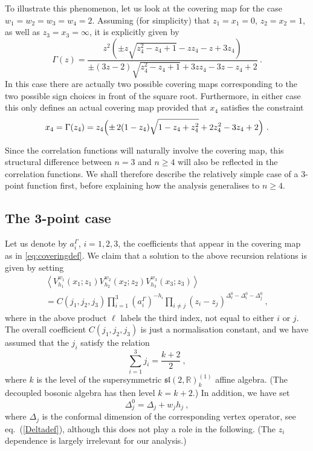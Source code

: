 \documentclass[12pt,a4paper]{article}
\newcommand{\be}{\begin{equation}}
\newcommand{\ee}{\end{equation}}
\begin{document}
To illustrate this phenomenon, let us look at the covering map for the case $w_1=w_2=w_3=w_4=2$. Assuming (for simplicity) that $z_1=x_1=0$, $z_2=x_2=1$, as well as $z_3=x_3=\infty$, it is explicitly given by
\be\label{cov2222}
\Gamma(z) = \frac{z^2 \left(\pm z \sqrt{z_4^2- z_4+1}-z z_4-z+3 z_4\right)}{\pm (3 z-2) \sqrt{z_4^2-z_4+1}+3 z z_4-3 z-z_4+2} \ .
\ee
In this case there are actually two possible covering maps corresponding to the two possible sign choices in front of the square root. Furthermore, in either case this only defines an actual covering map provided that $x_4$ satisfies the constraint
\be 
x_4=\Gamma(z_4) = z_4 \Bigl(\pm \, 2(1-z_4) \sqrt{1 - z_4 + z_4^2} + 2 z_4^2 - 3 z_4 + 2  \Bigr) \ . 
\ee
\smallskip

Since the correlation functions will naturally involve the covering map, this structural difference between $n=3$ and $n\geq 4$ will also be reflected in the correlation functions. We shall therefore describe the relatively simple case of a $3$-point function first, before explaining how the analysis generalises to $n\geq 4$. 


\subsection{The 3-point case}

Let us denote by $a_i^\Gamma$, $i=1,2,3$, the coefficients that appear in the covering map as in \eqref{eq:coveringdef}. We claim that a solution to the above recursion relations is given by setting 
\begin{multline}
 \left \langle V_{h_1}^{w_1}(x_1;z_1)V_{h_2}^{w_2}(x_2;z_2)V_{h_3}^{w_3} (x_3;z_3)\right \rangle \\
 =C(j_1,j_2,j_3)\prod_{i=1}^3 (a_i^\Gamma)^{-h_i}
\prod_{i\neq j} (z_i - z_j)^{\Delta_{\ell}^0- \Delta^0_i- \Delta^0_j} \ ,\label{eq:sol 3-point function}
\end{multline}
where in the above product $\ell$ labels the third index, not equal to either $i$ or $j$. 
The overall coefficient $C(j_1,j_2,j_3)$ is just a normalisation constant, and we have assumed that the $j_i$ satisfy the relation 
\be
\sum_{i=1}^{3} j_i = \frac{k+2}{2} \ , \label{eq:j constraint 3-point function}
\ee
where $k$ is the level of the supersymmetric $\mathfrak{sl}(2,\mathbb{R})_{k}^{(1)}$ affine algebra. (The decoupled bosonic algebra has then level $\hat{k}=k+2$.) In addition, we have set 
\be
\Delta_j^0 = \Delta_j + w_j h_j \ , 
\ee
where $\Delta_j$ is the conformal dimension of the corresponding vertex operator, see eq.~(\ref{Deltadef}), although this does not play a role in the following. (The $z_i$ dependence is largely irrelevant for our analysis.) 
\end{document}
